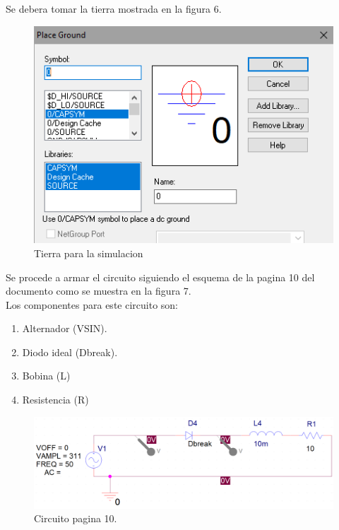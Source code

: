 \documentclass[letterpaper]{article}
\begin{document}
\begin{large}
\begin{enumerate}
\begin{figure}[htbp]
            \end{figure}
        \end{enumerate}
        Se debera tomar la tierra mostrada en la figura 6.\newpage
        \begin{figure}[htbp]
            \centering
            \includegraphics[scale=0.5]{gnd.png}
            \caption{Tierra para la simulacion}
            \label{fig:GNDsim}
        \end{figure}
        Se procede a armar el circuito siguiendo el esquema de la pagina 10 del documento como se muestra en la figura 7.\\ Los componentes para este circuito son:\\
        \begin{enumerate}
            \item Alternador (VSIN).
            \item Diodo ideal (Dbreak).
            \item Bobina (L)
            \item Resistencia (R)
        \end{enumerate}
        \begin{figure}[htbp]
        \centering
        \includegraphics[scale=0.4]{cir1.png}
        \caption{Circuito pagina 10.}
        \end{figure}

\end{large}
\end{document}
